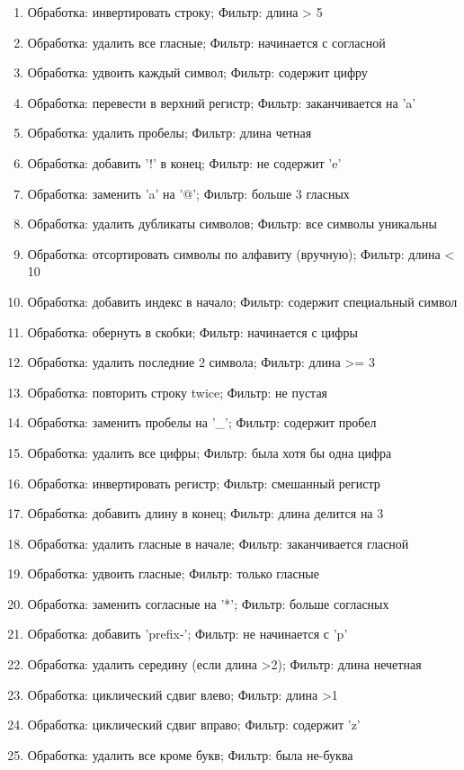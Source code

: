 \documentclass[12pt]{article}
\begin{document}
  \begin{enumerate}
    \item Обработка: инвертировать строку; Фильтр: длина > 5
    \item Обработка: удалить все гласные; Фильтр: начинается с согласной
    \item Обработка: удвоить каждый символ; Фильтр: содержит цифру
    \item Обработка: перевести в верхний регистр; Фильтр: заканчивается на 'a'
    \item Обработка: удалить пробелы; Фильтр: длина четная
    \item Обработка: добавить '!' в конец; Фильтр: не содержит 'e'
    \item Обработка: заменить 'a' на '@'; Фильтр: больше 3 гласных
    \item Обработка: удалить дубликаты символов; Фильтр: все символы уникальны
    \item Обработка: отсортировать символы по алфавиту (вручную); Фильтр: длина < 10
    \item Обработка: добавить индекс в начало; Фильтр: содержит специальный символ
    \item Обработка: обернуть в скобки; Фильтр: начинается с цифры
    \item Обработка: удалить последние 2 символа; Фильтр: длина >= 3
    \item Обработка: повторить строку twice; Фильтр: не пустая
    \item Обработка: заменить пробелы на '\_'; Фильтр: содержит пробел
    \item Обработка: удалить все цифры; Фильтр: была хотя бы одна цифра
    \item Обработка: инвертировать регистр; Фильтр: смешанный регистр
    \item Обработка: добавить длину в конец; Фильтр: длина делится на 3
    \item Обработка: удалить гласные в начале; Фильтр: заканчивается гласной
    \item Обработка: удвоить гласные; Фильтр: только гласные
    \item Обработка: заменить согласные на '*'; Фильтр: больше согласных
    \item Обработка: добавить 'prefix-'; Фильтр: не начинается с 'p'
    \item Обработка: удалить середину (если длина >2); Фильтр: длина нечетная
    \item Обработка: циклический сдвиг влево; Фильтр: длина >1
    \item Обработка: циклический сдвиг вправо; Фильтр: содержит 'z'
    \item Обработка: удалить все кроме букв; Фильтр: была не-буква
  \end{enumerate}
\end{document}
